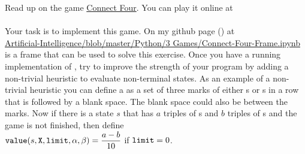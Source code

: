 \exercise
Read up on the game \href{https://en.wikipedia.org/wiki/Connect_Four}{Connect Four}.  You can play it online at
\\[0.2cm]
\hspace*{1.3cm}
\href{https://connect4.gamesolver.org/en/}{}
\\[0.2cm]
Your task is to implement this game.  On my github page () at
\\
\hspace*{1.3cm}
\href{https://github.com/karlstroetmann/Artificial-Intelligence/blob/master/Python/3
  Games/Connect-Four-Frame.ipynb}{Artificial-Intelligence/blob/master/Python/3 Games/Connect-Four-Frame.ipynb} 
\\[0.2cm]
is a frame  that can be used to solve this exercise.  
Once you have a running implementation of , try to improve the strength of your program by
adding a non-trivial heuristic to evaluate non-terminal states.  As an example of a non-trivial heuristic you
can define a  as a set of three marks of either s or s in a row that is
followed by a blank space.  The blank space could also be between the marks.  Now if there is a state $s$ that
has $a$ triples of s and $b$ triples of s and the game is not finished, then define
\\[0.2cm]
\hspace*{1.3cm}
$\displaystyle \texttt{value}(s, \texttt{X}, \texttt{limit}, \alpha, \beta) = \frac{a - b}{10}$ \quad if $\texttt{limit} = 0$.
\eox

